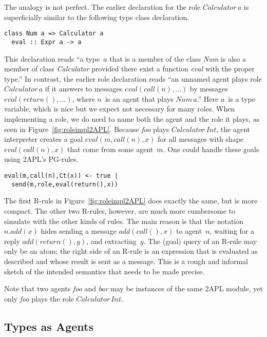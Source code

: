 \documentclass[conference,compsoc]{IEEEtran} %
\begin{document}
The analogy is not perfect. The earlier declaration for the role
$\mathit{Calculator}\,a$ is superficially similar to the following type
class declaration.
\begin{lstlisting}[style=hs]
class Num a => Calculator a
  eval :: Expr a -> a
\end{lstlisting}
This declaration reads ``a type~$a$ that is a member of the class
\textit{Num} is also a member of class \textit{Calculator} provided there
exist a function \textit{eval} with the proper type.'' In contrast, the
earlier role declaration reads ``an unnamed agent plays role
$\mathit{Calculator}\,a$ if it answers to messages
$\mathit{eval}(\mathit{call}(n),\ldots)$ by messages
$\mathit{eval}(\mathit{return}(),\ldots)$, where $n$~is an agent that plays
$\mathit{Num}\,a$.'' Here $a$~is a type variable, which is nice but we
expect not necessary for many roles. When implementing a role, we do need
to name both the agent and the role it plays, as seen in
Figure~\ref{fig:roleimpl2APL}. Because \textit{foo} plays
$\mathit{Calculator}\,\mathit{Int}$, the agent interpreter creates a goal
$\mathit{eval}(m,\mathit{call}(n),x)$ for all messages with shape
$\mathit{eval}(\mathit{call}(n),x)$ that come from some agent~$m$.  One
could handle these goals using 2APL's PG-rules.
\begin{lstlisting}[style=me]
eval(m,call(n),Ct(x)) <- true |
  send(m,role,eval(return(),x))
\end{lstlisting}
The first R-rule in Figure~\ref{fig:roleimpl2APL} does exactly the same,
but is more compact. The other two R-rules, however, are much more
cumbersome to simulate with the other kinds of rules. The main reason is
that the notation $n.\mathit{add}(x)$ hides sending a message
$\mathit{add}(\mathit{call}(),x)$ to agent~$n$, waiting for a reply
$\mathit{add}(\mathit{return}(),y)$, and extracting~$y$. The (goal) query
of an R-rule may only be an atom; the right side of an R-rule is an
expression that is evaluated as described and whose result is sent as a
message.  This is a rough and informal sketch of the intended semantics
that needs to be made precise.

Note that two agents \textit{foo} and \textit{bar} may be instances of the
same 2APL module, yet only \textit{foo} plays the role
$\mathit{Calculator}\,\mathit{Int}$.


\subsection{Types as Agents} %
\end{document}
